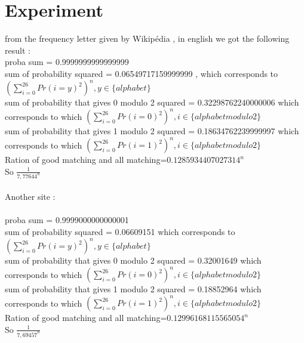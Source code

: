 \documentclass{article}
\begin{document}
\section{Experiment}
from the frequency letter given by Wikipédia , in english we got the following result :\\
proba sum = 0.9999999999999999\\
sum of probability squared = 0.06549717159999999 , which corresponds to $(\sum_{i=0}^{26}{Pr(i=y)^2})^n, y \in \{alphabet\} $\\
sum of probability that gives 0 modulo 2 squared  = 0.32298762240000006 which corresponds to which $(\sum_{i=0}^{26}{Pr(i=0)^2})^n, i \in \{alphabet modulo 2\} $\\
sum of probability that gives 1 modulo 2 squared = 0.18634762239999997 which corresponds to which $(\sum_{i=0}^{26}{Pr(i=1)^2})^n, i \in \{alphabet modulo 2\} $\\
Ration of good matching and all matching=$0.1285934407027314^n$\\
So $\frac{1}{7,77644^n}$
\\
\\
Another site :\\
\\
proba sum = 0.9999000000000001\\
sum of probability squared = 0.06609151 which corresponds to $(\sum_{i=0}^{26}{Pr(i=y)^2})^n, y \in \{alphabet\} $\\
sum of probability that gives 0 modulo 2 squared = 0.32001649 which corresponds to which $(\sum_{i=0}^{26}{Pr(i=0)^2})^n, i \in \{alphabet modulo 2\} $\\
sum of probability that gives 1 modulo 2 squared = 0.18852964 which corresponds to which $(\sum_{i=0}^{26}{Pr(i=1)^2})^n, i \in \{alphabet modulo 2\} $\\
Ration of good matching and all matching=$0.12996168115565054^n$\\
So $\frac{1}{7,69457^n}$
\end{document}
